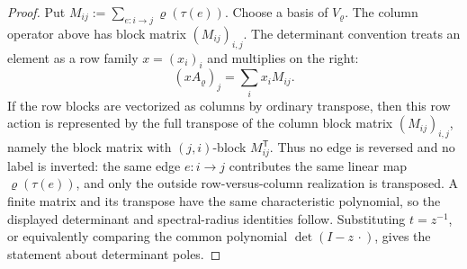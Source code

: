 \begin{proof}
  Put
  \(M_{ij}:=\sum_{e:i\to j}\varrho(\tau(e))\).  Choose a basis of
  \(V_\varrho\).  The column operator above has block matrix
  \((M_{ij})_{i,j}\).  The determinant convention treats an element as a
  row family \(x=(x_i)_i\) and multiplies on the right:
  \[
    (xA_\varrho)_j=\sum_i x_iM_{ij}.
  \]
  If the row blocks are vectorized as columns by ordinary transpose, then
  this row action is represented by the full transpose of the column block
  matrix \((M_{ij})_{i,j}\), namely the block matrix with \((j,i)\)-block
  \(M_{ij}^{\mathsf T}\).  Thus no edge is reversed and no label is
  inverted: the same edge \(e:i\to j\) contributes the same linear map
  \(\varrho(\tau(e))\), and only the outside row-versus-column
  realization is transposed.  A finite matrix and its transpose have the
  same characteristic polynomial, so the displayed determinant and
  spectral-radius identities follow.  Substituting \(t=z^{-1}\), or
  equivalently comparing the common polynomial
  \(\det(I-z\,\cdot)\), gives the statement about determinant poles.
\end{proof}


